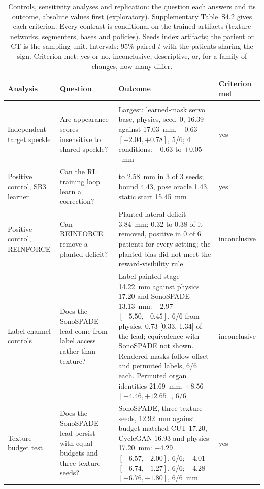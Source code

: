 
\begin{table}[tp]
\renewcommand{\baselinestretch}{1}\scriptsize\setlength{\fboxsep}{0.6pt}
\caption{Controls, sensitivity analyses and replication: the question each answers and its outcome, absolute values first (exploratory). Supplementary Table~S4.2 gives each criterion. Every contrast is conditional on the trained artifacts (texture networks, segmenters, bases and policies). Seeds index artifacts; the patient or CT is the sampling unit. Intervals: 95\% paired $t$ with the patients sharing the sign. Criterion met: yes or no, inconclusive, descriptive, or, for a family of changes, how many differ.}
\label{tab:checks-summary}
\centering
\setlength{\tabcolsep}{3pt}
\begin{tabularx}{\textwidth}{@{}>{\raggedright\arraybackslash}p{} >{\raggedright\arraybackslash}p{} >{\raggedright\arraybackslash}X >{\raggedright\arraybackslash}p{}@{}}
\toprule
Analysis & Question & Outcome & Criterion met \\
\midrule
\multicolumn{4}{@{}l}{\textit{Controls}} \\
Independent target speckle & Are appearance scores insensitive to shared speckle? & Largest: learned-mask servo base, physics, seed~0, 16.39 against 17.03~mm, $-0.63$ $[-2.04, +0.78]$, 5/6; 4 conditions: $-0.63$ to $+0.05$~mm & yes \\[1pt]
Positive control, SB3 learner & Can the RL training loop learn a correction? & 2.40 to 2.58~mm in 3 of 3 seeds; bound 4.43, pose oracle 1.43, static start 15.45~mm & yes \\[1pt]
Positive control, REINFORCE & Can REINFORCE remove a planted deficit? & Planted lateral deficit 3.84~mm; 0.32 to 0.38 of it removed, positive in 0 of 6 patients for every setting; the planted bias did not meet the reward-visibility rule & inconclusive \\[1pt]
Label-channel controls & Does the SonoSPADE lead come from label access rather than texture? & Label-painted stage 14.22~mm against physics 17.20 and SonoSPADE 13.13~mm: $-2.97$ $[-5.50, -0.45]$, 6/6 from physics, 0.73 [0.33, 1.34] of the lead; equivalence with SonoSPADE not shown. Rendered masks follow offset and permuted labels, 6/6 each. Permuted organ identities 21.69~mm, $+8.56$ $[+4.46, +12.65]$, 6/6 & inconclusive \\[1pt]
Texture-budget test & Does the SonoSPADE lead persist with equal budgets and three texture seeds? & SonoSPADE, three texture seeds, 12.92~mm against budget-matched CUT 17.20, CycleGAN 16.93 and physics 17.20~mm: $-4.29$ $[-6.57, -2.00]$, 6/6; $-4.01$ $[-6.74, -1.27]$, 6/6; $-4.28$ $[-6.76, -1.80]$, 6/6~mm & yes \\[1pt]

\end{tabularx}
\end{table}

